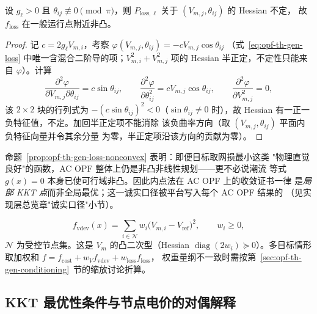 \begin{proposition}[AC 网损目标的非凸性]\label{prop:opf-th-gen-loss-nonconvex}
设 $g_\ell>0$ 且 $\theta_{ij}\not\equiv0\pmod\pi$，则
$P_{\mathrm{loss},\ell}$ 关于 $(V_{m,j},\theta_{ij})$ 的 Hessian 不定，
故 $f_{\mathrm{loss}}$ 在一般运行点附近非凸。
\end{proposition}

\begin{proof}
记 $c=2g_\ell V_{m,i}$，考察
$\varphi(V_{m,j},\theta_{ij})=-cV_{m,j}\cos\theta_{ij}$
（式~\eqref{eq:opf-th-gen-loss} 中唯一含混合二阶导的项；$V_{m,i}^2+
V_{m,j}^2$ 项的 Hessian 半正定，不定性只能来自 $\varphi$）。计算
\begin{equation}
\frac{\partial^2\varphi}{\partial V_{m,j}\partial\theta_{ij}}
=c\sin\theta_{ij},\qquad
\frac{\partial^2\varphi}{\partial\theta_{ij}^2}
=cV_{m,j}\cos\theta_{ij},\qquad
\frac{\partial^2\varphi}{\partial V_{m,j}^2}=0,
\end{equation}
该 $2\times2$ 块的行列式为 $-(c\sin\theta_{ij})^2<0$（$\sin\theta_{ij}
\neq0$ 时），故 Hessian 有一正一负特征值，不定。加回半正定项不能消除
该负曲率方向（取 $(V_{m,j},\theta_{ij})$ 平面内负特征向量并令其余分量
为零，半正定项沿该方向的贡献为零）。
\end{proof}

\begin{remark}[非凸性的含义]\label{rem:opf-th-gen-nonconvex-meaning}
命题~\ref{prop:opf-th-gen-loss-nonconvex} 表明：即便目标取网损最小这类
"物理直觉良好"的函数，AC OPF 整体上仍是非凸非线性规划——更不必说潮流
等式 $g(x)=0$ 本身已使可行域非凸。因此内点法在 AC OPF 上的收敛证书一律
是\emph{局部 KKT 点}而非全局最优；这一诚实口径被平台写入每个 AC OPF 结果的
（见实现层总览章"诚实口径"小节）。
\end{remark}

\begin{definition}[电压偏差目标]\label{def:opf-th-gen-vdev}
\begin{equation}
f_{\mathrm{vdev}}(x)=\sum_{i\in\mathcal N}w_i\bigl(V_{m,i}-V_{\mathrm{ref}}
\bigr)^2,\qquad w_i\ge0,
\end{equation}
$\mathcal N$ 为受控节点集。这是 $V_m$ 的凸二次型（Hessian
$\operatorname{diag}(2w_i)\succeq0$）。多目标情形取加权和
$f=f_{\mathrm{cost}}+w_V f_{\mathrm{vdev}}+w_{\mathrm{loss}}f_{\mathrm{loss}}$，
权重量纲不一致时需按第~\ref{sec:opf-th-gen-conditioning}~节的缩放讨论折算。
\end{definition}

\subsection{KKT 最优性条件与节点电价的对偶解释}\label{sec:opf-th-gen-kkt-lmp}

